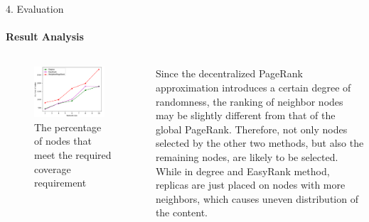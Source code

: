 \documentclass{beamer}		%
\begin{document}
\begin{frame}{4. Evaluation}
\framesubtitle{Result Analysis}
\begin{columns}
\begin{figure}
    \centering
    \includegraphics[width=0.9\textwidth]{Figure4.png}
    \caption{The percentage of nodes that meet the required coverage requirement}
\end{figure}
Since the decentralized PageRank approximation introduces a certain degree of randomness, the ranking of neighbor nodes may be slightly different from that of the global PageRank. Therefore, not only nodes selected by the other two methods, but also the remaining nodes, are likely to be selected. While in degree and EasyRank method, replicas are just placed on nodes with more neighbors, which causes uneven distribution of the content.
\end{columns}
\end{frame}
\end{document}
